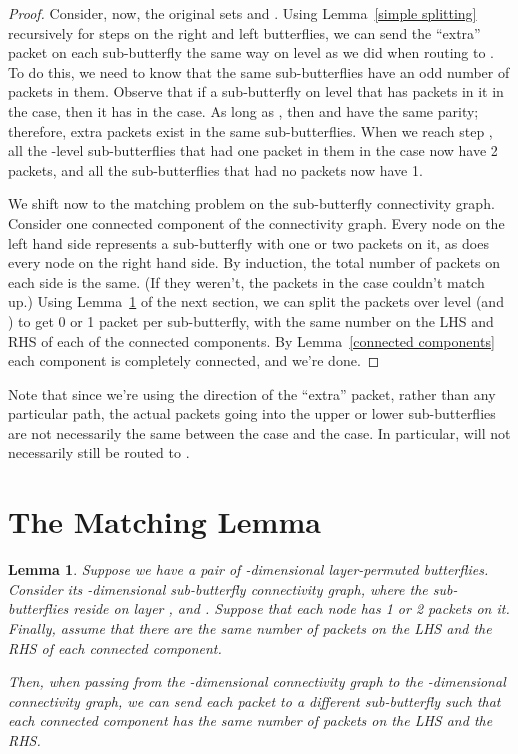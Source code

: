 \documentclass[12pt]{article}
\newtheorem{lemma}{Lemma}
\begin{document}
\begin{proof}
Consider, now, the original sets  and .  Using 
Lemma~\ref{simple splitting} recursively for  steps
on the right and left
butterflies, we can send the ``extra'' packet on each sub-butterfly
the same way on level  as we did when routing  to .  
To do this, we need to know that the same sub-butterflies have an
odd number of packets in them.
Observe that if a sub-butterfly on level  that has  packets in it
in the  case, then it  
has  in the  case.  
As long as , then
 and  have the same parity; therefore, extra packets
exist in the same sub-butterflies.  When we reach step , all
the -level sub-butterflies that had one packet in them in the 
case now have 2 packets, and all the sub-butterflies that had no
packets now have 1.

We shift now to the matching problem on the sub-butterfly connectivity graph.
Consider one connected component of the connectivity graph.
Every node on the left hand side represents a sub-butterfly with
one or two packets on it, as does
every node on the right hand side.  By induction, the total number of
packets on each side is the same.  (If they weren't, the packets in
the  case couldn't match up.)
Using Lemma~\ref{matching} of the 
next section, we can split the packets over level  (and )
to get 0 or 1 packet per sub-butterfly, with the same number on the 
LHS and RHS of each of the connected components.  By 
Lemma~\ref{connected components} each component is completely connected,
and we're done. \end{proof}

Note that since we're using the direction of the ``extra'' packet, rather
than any particular path, the actual packets going into the upper or
lower sub-butterflies are not necessarily the same between the 
case and the  case.  In particular,  will not necessarily still
be routed to .

\section{The Matching Lemma}
\begin{lemma} \label{matching}
Suppose we have a pair of -dimensional layer-permuted butterflies.
Consider its -dimensional
sub-butterfly connectivity graph, where the sub-butterflies
reside on layer , and .  Suppose
that each node has 1 or 2 packets
on it.  Finally, assume that there are the same number of packets
on the LHS and the RHS of each connected component.

Then, when passing from the -dimensional connectivity graph to the 
-dimensional connectivity graph, we can send each packet to
a different sub-butterfly such that each connected component has
the same number of packets on the LHS and the RHS.
\end{lemma}
\end{document}
